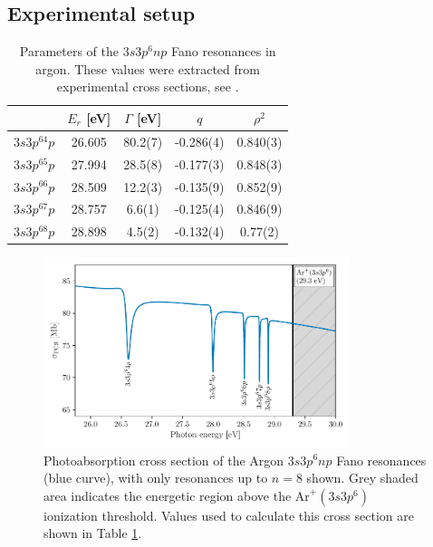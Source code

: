 \subsection{Experimental setup}
\label{sec:ATS_ar_exp_setup}


\begin{table}[]
	\centering
	\begin{tabular}{lcccc}
		\hline\hline
		\multicolumn{1}{c}{} & $E_r$ [eV]   & $\Gamma$ [eV]   & $q$         & $\rho^2$     \\ \hline
		$3s3p^64p$              & 26.605 & 80.2(7) & -0.286(4) & 0.840(3) \\
		$3s3p^65p$              & 27.994 & 28.5(8) & -0.177(3) & 0.848(3) \\
		$3s3p^66p$              & 28.509 & 12.2(3) & -0.135(9) & 0.852(9) \\
		$3s3p^67p$              & 28.757 & 6.6(1)  & -0.125(4) & 0.846(9) \\
		$3s3p^68p$              & 28.898 & 4.5(2)  & -0.132(4) & 0.77(2)  \\ \hline\hline
	\end{tabular}
	\caption[Parameters of the $3s3p^6np$ Fano resonances in argon]{Parameters of the $3s3p^6np$ Fano resonances in argon. These values were extracted from experimental cross sections, see \cite{caretteMulticonfigurationalHartreeFockClosecoupling2013, wuElectronimpactStudyValence1995, berrahAngulardistributionParametersAndRmatrix1996}.}
	\label{table:fano_params}
\end{table}

\begin{figure}
	\centering
	\includegraphics[width=0.8\textwidth]{figures/ATS/fano_GS.pdf}
	\caption[Photoabsorption cross section of the Argon $3s3p^6np$ Fano resonances]{Photoabsorption cross section of the Argon $3s3p^6np$ Fano resonances (blue curve), with only resonances up to $n=8$ shown.  Grey shaded area indicates the energetic region above the $\mathrm{Ar}^+(3s3p^6)$ ionization threshold. Values used to calculate this cross section are shown in Table \ref{table:fano_params}.}
	\label{fig:fano_gs_pcs}
\end{figure}

